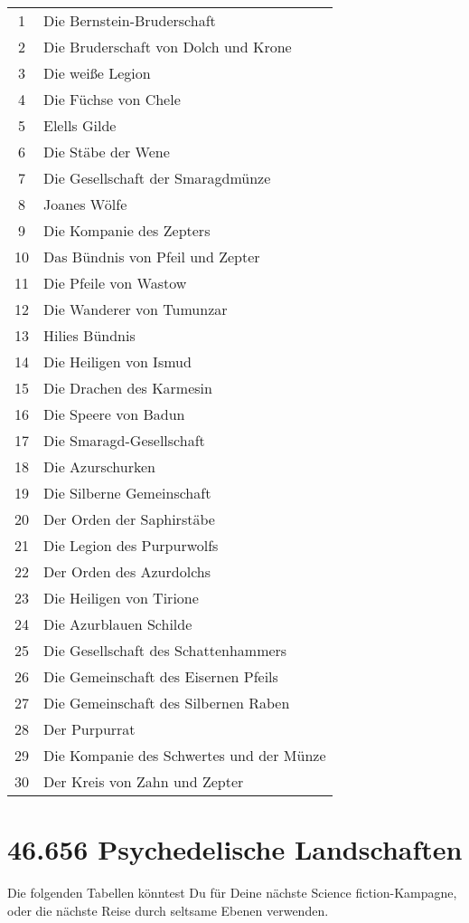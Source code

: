 \documentclass[11pt]{wbzine}
\begin{document}
\begin{tabularx}{\columnwidth}{cZ}
1 & Die Bernstein-Bruderschaft\\
2 & Die Bruderschaft von Dolch und Krone\\
3 & Die weiße Legion\\
4 & Die Füchse von Chele\\
5 & Elells Gilde\\
6 & Die Stäbe der Wene\\
7 & Die Gesellschaft der Smaragdmünze\\
8 & Joanes Wölfe\\
9 & Die Kompanie des Zepters\\
10 & Das Bündnis von Pfeil und Zepter\\
11 & Die Pfeile von Wastow\\
12 & Die Wanderer von Tumunzar\\
13 & Hilies Bündnis\\
14 & Die Heiligen von Ismud\\
15 & Die Drachen des Karmesin\\
16 & Die Speere von Badun\\
17 & Die Smaragd-Gesellschaft\\
18 & Die Azurschurken\\
19 & Die Silberne Gemeinschaft\\
20 & Der Orden der Saphirstäbe\\
21 & Die Legion des Purpurwolfs\\
22 & Der Orden des Azurdolchs\\
23 & Die Heiligen von Tirione\\
24 & Die Azurblauen Schilde\\
25 & Die Gesellschaft des Schattenhammers\\
26 & Die Gemeinschaft des Eisernen Pfeils\\
27 & Die Gemeinschaft des Silbernen Raben\\
28 & Der Purpurrat\\
29 & Die Kompanie des Schwertes und der Münze\\
30 & Der Kreis von Zahn und Zepter\\
\end{tabularx}

\section{46.656 Psychedelische Landschaften}

Die folgenden Tabellen könntest Du für Deine nächste Science
fiction-Kampagne, oder die nächste Reise durch seltsame Ebenen
verwenden.
\end{document}
